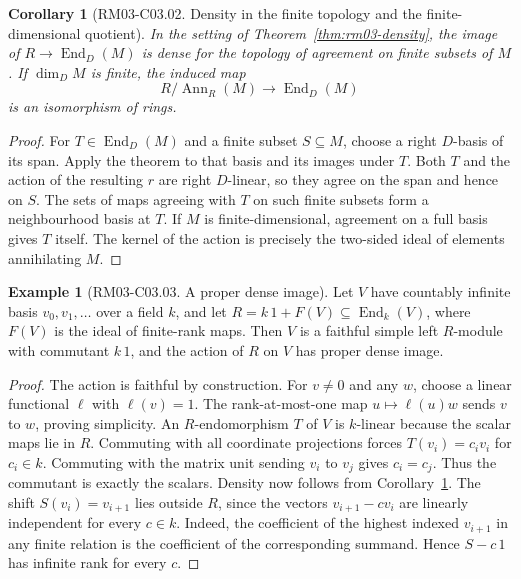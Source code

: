 \documentclass[11pt,oneside,openany]{book}
\newtheorem{corollary}[theorem]{Corollary}
\theoremstyle{definition}
\newtheorem{example}[theorem]{Example}
\theoremstyle{remark}
\begin{document}
\begin{corollary}[RM03-C03.02. Density in the finite topology and the finite-dimensional quotient]
\label{cor:rm03-density-finite}
In the setting of Theorem~\ref{thm:rm03-density}, the image of
\(R\to\operatorname{End}_D(M)\) is dense for the topology of agreement
on finite subsets of \(M\). If \(\dim_D M\) is finite, the induced map
\[
      R/\operatorname{Ann}_R(M)\longrightarrow\operatorname{End}_D(M)
\]
is an isomorphism of rings.
\end{corollary}
\begin{proof}
For \(T\in\operatorname{End}_D(M)\) and a finite subset \(S\subseteq M\),
choose a right \(D\)-basis of its span. Apply the theorem to that basis
and its images under \(T\). Both \(T\) and the action of the resulting
\(r\) are right \(D\)-linear, so they agree on the span and hence on
\(S\). The sets of maps agreeing with \(T\) on such finite subsets
form a neighbourhood basis at \(T\). If \(M\) is finite-dimensional,
agreement on a full basis gives \(T\) itself. The kernel of the action
is precisely the two-sided ideal of elements annihilating \(M\).
\end{proof}

\begin{example}[RM03-C03.03. A proper dense image]
\label{ex:rm03-density-proper}
Let \(V\) have countably infinite basis \(v_0,v_1,\ldots\) over a
field \(k\), and let \(R=k\,1+F(V)\subseteq\operatorname{End}_k(V)\),
where \(F(V)\) is the ideal of finite-rank maps. Then \(V\) is a
faithful simple left \(R\)-module with commutant \(k\,1\), and the
action of \(R\) on \(V\) has proper dense image.
\end{example}
\begin{proof}
The action is faithful by construction. For \(v\ne0\) and any \(w\),
choose a linear functional \(\ell\) with \(\ell(v)=1\). The rank-at-most-one
map \(u\mapsto\ell(u)w\) sends \(v\) to \(w\), proving simplicity.
An \(R\)-endomorphism \(T\) of \(V\) is \(k\)-linear because the scalar
maps lie in \(R\). Commuting with all coordinate projections forces
\(T(v_i)=c_i v_i\) for \(c_i\in k\). Commuting with the matrix unit
sending \(v_i\) to \(v_j\) gives \(c_i=c_j\). Thus the commutant is
exactly the scalars. Density now follows from
Corollary~\ref{cor:rm03-density-finite}. The shift \(S(v_i)=v_{i+1}\)
lies outside \(R\), since the vectors \(v_{i+1}-c v_i\) are linearly
independent for every \(c\in k\). Indeed, the coefficient of the
highest indexed \(v_{i+1}\) in any finite relation is the coefficient
of the corresponding summand. Hence \(S-c\,1\) has infinite rank for
every \(c\).
\end{proof}
\end{document}
